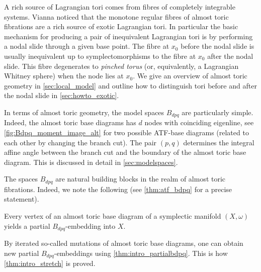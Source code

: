 \documentclass[12pt,a4paper,abstract=true,draft]{scrartcl}
\begin{document}
A rich source of Lagrangian tori comes from fibres of completely integrable systems.
Vianna \cite{Via16,Via17} noticed that the monotone regular fibres of almost toric fibrations are a rich source of exotic Lagrangian tori.
In particular the basic mechanism for producing a pair of inequivalent Lagrangian tori is by performing a nodal slide through a given base point.
The fibre at $x_0$ before the nodal slide is usually inequivalent up to symplectomorphisms to the fibre at $x_0$ after the nodal slide.
This fibre degenerates to \emph{pinched torus} (or, equivalently, a Lagrangian Whitney sphere) when the node lies at $x_0$.
We give an overview of almost toric geometry in \cref{sec:local_model} and outline how to distinguish tori before and after the nodal slide in \cref{sec:howto_exotic}.


In terms of almost toric geometry, the model spaces $B_{dpq}$ are particularly simple.
Indeed, the almost toric base diagrams has $d$ nodes with coinciding eigenline, see \cref{fig:Bdpq_moment_image_alt} for two possible ATF-base diagrams (related to each other by changing the branch cut).
The pair $(p,q)$ determines the integral affine angle between the branch cut and the boundary of the almost toric base diagram.
This is discussed in detail in \cref{sec:modelspaces}.

The spaces $B_{dpq}$ are natural building blocks in the realm of almost toric fibrations.
Indeed, we note the following (see \cref{thm:atf_bdpq} for a precise statement).

\begin{proposition}
    \label{thm:intro_partialbdpq}
    Every vertex of an almost toric base diagram of a symplectic manifold $(X,\omega)$ yields a partial $B_{dpq}$-embedding into $X$. 
\end{proposition}

By iterated so-called mutations of almost toric base diagrams, one can obtain new partial $B_{dpq}$-embeddings using \cref{thm:intro_partialbdpq}.
This is how \cref{thm:intro_stretch} is proved.
\end{document}
